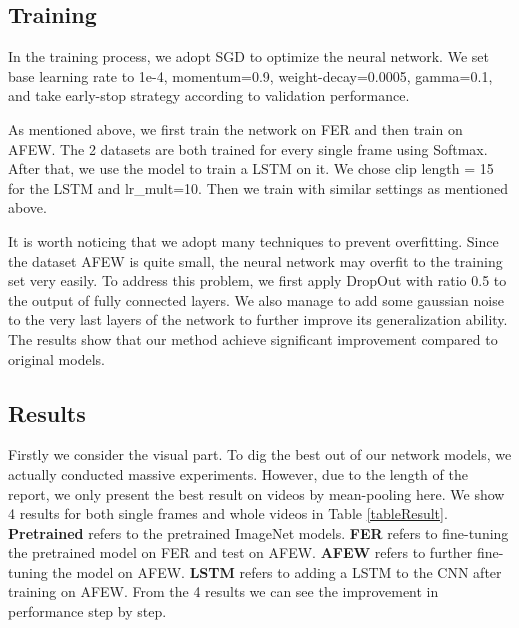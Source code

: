 \documentclass[10pt,twocolumn,letterpaper]{article}
\begin{document}
\subsection{Training}

In the training process, we adopt SGD to optimize the neural network. We set base learning rate to 1e-4, momentum=0.9, weight-decay=0.0005, gamma=0.1, and take early-stop strategy according to validation performance.

As mentioned above, we first train the network on FER and then train on AFEW. The 2 datasets are both trained for every single frame using Softmax. After that, we use the model to train a LSTM on it. We chose clip length = 15 for the LSTM and lr\_mult=10. Then we train with similar settings as mentioned above.

It is worth noticing that we adopt many techniques to prevent overfitting. Since the dataset AFEW is quite small, the neural network may overfit to the training set very easily. To address this problem, we first apply DropOut with ratio 0.5 to the output of fully connected layers. We also manage to add some gaussian noise to the very last layers of the network to further improve its generalization ability. The results show that our method achieve significant improvement compared to original models.

\subsection{Results}

Firstly we consider the visual part. To dig the best out of our network models, we actually conducted massive experiments. However, due to the length of the report, we only present the best result on videos by mean-pooling here. We show 4 results for both single frames and whole videos in Table \ref{tableResult}. \textbf{Pretrained} refers to the pretrained ImageNet models. \textbf{FER} refers to fine-tuning the pretrained model on FER and test on AFEW. \textbf{AFEW} refers to further fine-tuning the model on AFEW. \textbf{LSTM} refers to adding a LSTM to the CNN after training on AFEW. From the 4 results we can see the improvement in performance step by step.
\end{document}
